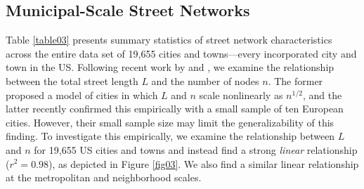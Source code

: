 \documentclass[Afour,sageh,times]{sagej}
\begin{document}
\subsection{Municipal-Scale Street Networks}

Table \ref{table03} presents summary statistics of street network characteristics across the entire data set of 19,655 cities and towns---every incorporated city and town in the US. Following recent work by \citet{barthelemy_modeling_2008} and \citet{strano_urban_2013}, we examine the relationship between the total street length $L$ and the number of nodes $n$. The former proposed a model of cities in which $L$ and $n$ scale nonlinearly as $n^{1/2}$, and the latter recently confirmed this empirically with a small sample of ten European cities. However, their small sample size may limit the generalizability of this finding. To investigate this empirically, we examine the relationship between $L$ and $n$ for 19,655 US cities and towns and instead find a strong \emph{linear} relationship ($r^{2}=0.98$), as depicted in Figure \ref{fig03}. We also find a similar linear relationship at the metropolitan and neighborhood scales.
\end{document}
